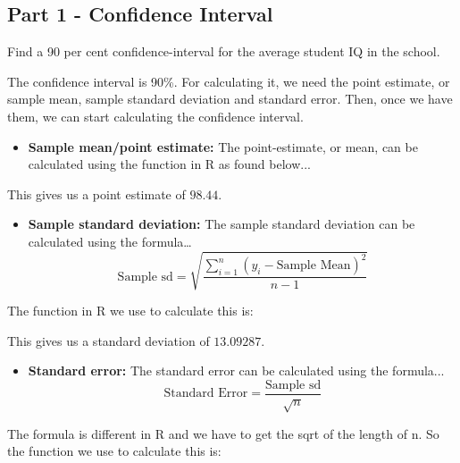 \documentclass[12pt,letterpaper]{article}
\begin{document}
\begin{enumerate}
	
	\subsection*{Part 1 - Confidence Interval}
	Find a 90 per cent confidence-interval for the average student IQ in the school.
	
	The confidence interval is 90\%. For calculating it, we need the point estimate, or sample mean, sample standard deviation and standard error. Then, once we have them, we can start calculating the confidence interval.
	
\newpage

	\begin{itemize}
		\item \textbf{Sample mean/point estimate:} The point-estimate, or mean, can be calculated using the function in R as found below...
	\end{itemize}
		
	
	
	This gives us a point estimate of \(98.44\). 
	
	\begin{itemize}
		\item \textbf{Sample standard deviation:} The sample standard deviation can be calculated using the formula…			\[
		\text{Sample sd} = \sqrt{\frac{\sum_{i=1}^{n} (y_i - \text{Sample Mean})^2}{n-1}}
		\]
	\end{itemize}
	
	The function in R we use to calculate this is:
    
	
	This gives us a standard deviation of \(13.09287\). 
	
	\begin{itemize}
		\item \textbf{Standard error:} The standard error can be calculated using the formula...
		\[
		\text{Standard Error} = \frac{\text{Sample sd}}{\sqrt{n}}
		\]
	\end{itemize}
	
	The formula is different in R and we have to get the sqrt of the length of n. So the function we use to calculate this is:
    
	

\end{enumerate}
\end{document}
